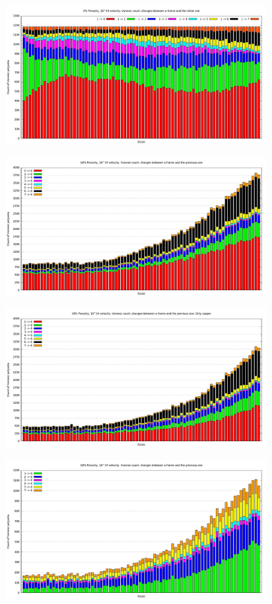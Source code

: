 \documentclass[10pt, oneside]{article} %
\begin{document}
\begin{figure}[H]
\centering
\includegraphics[width=10cm]{Figures/Porosidad_2vel_comp_voronoi_hist9.png}
\caption{}
\label{fg:18comp}
\end{figure}

\begin{figure}[H]
\centering
\includegraphics[width=10cm]{Figures/Porosidad_2vel_comp_voronoi_hist10.png}
\caption{}
\label{fg:19comp}
\end{figure}

\begin{figure}[H]
\centering
\includegraphics[width=10cm]{Figures/Porosidad_2vel_comp_voronoi_hist11.png}
\caption{}
\end{figure}

\begin{figure}[H]
\centering
\includegraphics[width=10cm]{Figures/Porosidad_2vel_comp_voronoi_hist12.png}
\caption{}
\end{figure}
\end{document}
